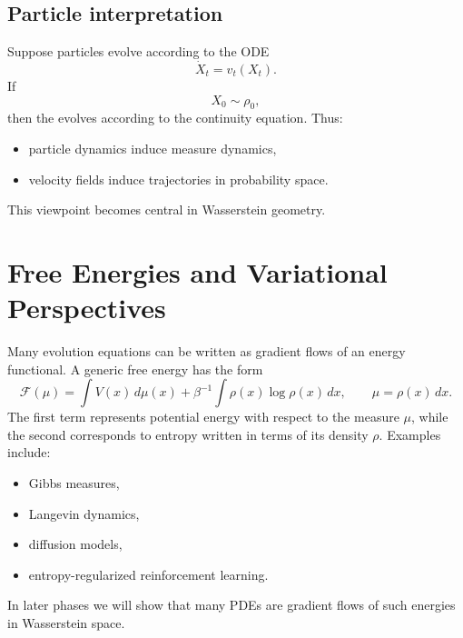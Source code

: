 \subsection{Particle interpretation}
Suppose particles evolve according to the ODE
\[
\dot X_t = v_t(X_t).
\]
If
\[
X_0 \sim \rho_0,
\]
then the  evolves according to the continuity equation.
Thus:
\begin{itemize}
    \item particle dynamics induce measure dynamics,
    \item velocity fields induce trajectories in probability space.
\end{itemize}
This viewpoint becomes central in Wasserstein geometry.
\section{Free Energies and Variational Perspectives}
Many evolution equations can be written as gradient flows of an energy functional.
A generic free energy has the form
\[
\mathcal F(\mu)
=
\int V(x)\,d\mu(x)
+
\beta^{-1}
\int \rho(x)\log \rho(x)\,dx,
\qquad
\mu=\rho(x)\,dx.
\]
The first term represents potential energy with respect to the measure $\mu$, while the second corresponds to entropy written in terms of its density $\rho$.
Examples include:
\begin{itemize}
    \item Gibbs measures,
    \item Langevin dynamics,
    \item diffusion models,
    \item entropy-regularized reinforcement learning.
\end{itemize}
In later phases we will show that many PDEs are gradient flows of such energies in Wasserstein space.
